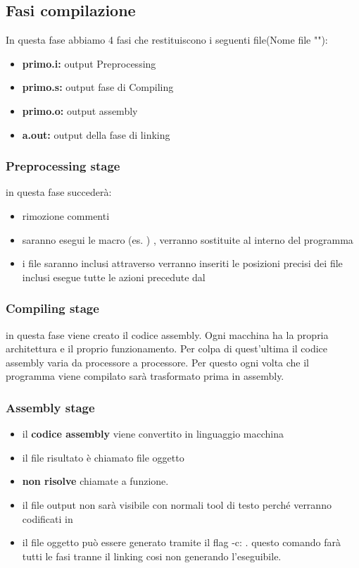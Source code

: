 \subsection{Fasi compilazione}

In questa fase abbiamo 4 fasi che restituiscono i seguenti file(Nome file ""):
\begin{itemize}
    \item \textbf{primo.i:} output Preprocessing
    \item \textbf{primo.s:} output fase di Compiling
    \item \textbf{primo.o:} output assembly
    \item \textbf{a.out:} output della fase di linking
\end{itemize}

\subsubsection{Preprocessing stage}
in questa fase succederà:
\begin{itemize}
    
    \item rimozione commenti
    \item saranno esegui le macro (es. ) , verranno sostituite al interno del programma 
    \item i file saranno inclusi attraverso 
    verranno inseriti le posizioni precisi dei file inclusi 
    esegue tutte le azioni precedute dal \code{\#}
\end{itemize}

\subsubsection{Compiling stage}
in questa fase viene creato il codice assembly. Ogni macchina ha la propria architettura e il proprio 
funzionamento. Per colpa di quest'ultima il codice assembly varia da processore a processore. Per 
questo ogni volta che il programma viene compilato sarà trasformato prima in assembly.

\newpage

\subsubsection{Assembly stage}
\begin{itemize}
    \item il \textbf{codice assembly} viene convertito in linguaggio macchina
    \item il file risultato è chiamato file oggetto
    \item \textbf{non risolve} chiamate a funzione.
    \item il file output non sarà visibile con normali tool di testo perché verranno codificati in 
    \item il file oggetto  può essere generato tramite il flag -c: \newline  {} . questo comando farà tutti le fasi tranne il linking cosi non generando l'eseguibile.
\end{itemize}

